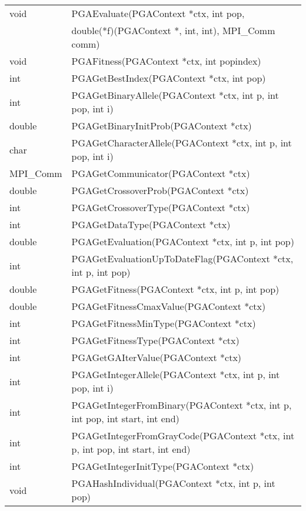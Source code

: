 \documentclass{report}
\begin{document}
\begin{tabular}{|l|l|}
void &  PGAEvaluate(PGAContext *ctx, int pop, \\ 
     & double(*f)(PGAContext *, int, int), MPI\_Comm comm) \\ \hline
void &  PGAFitness(PGAContext *ctx, int popindex) \\ \hline
int &  PGAGetBestIndex(PGAContext *ctx, int pop) \\ \hline
int &  PGAGetBinaryAllele(PGAContext *ctx, int p, int pop, int i) \\ \hline
double &  PGAGetBinaryInitProb(PGAContext *ctx) \\ \hline
char &  PGAGetCharacterAllele(PGAContext *ctx, int p, int pop, int i) \\ \hline
MPI\_Comm & PGAGetCommunicator(PGAContext *ctx) \\ \hline
double &  PGAGetCrossoverProb(PGAContext *ctx) \\ \hline
int &  PGAGetCrossoverType(PGAContext *ctx) \\ \hline
int &  PGAGetDataType(PGAContext *ctx) \\ \hline
double &  PGAGetEvaluation(PGAContext *ctx, int p, int pop) \\ \hline
int &  PGAGetEvaluationUpToDateFlag(PGAContext *ctx, int p, int pop) \\ \hline
double &  PGAGetFitness(PGAContext *ctx, int p, int pop) \\ \hline
double &  PGAGetFitnessCmaxValue(PGAContext *ctx) \\ \hline
int &  PGAGetFitnessMinType(PGAContext *ctx) \\ \hline
int &  PGAGetFitnessType(PGAContext *ctx) \\ \hline
int &  PGAGetGAIterValue(PGAContext *ctx) \\ \hline
int &  PGAGetIntegerAllele(PGAContext *ctx, int p, int pop, int i) \\ \hline
int &  PGAGetIntegerFromBinary(PGAContext *ctx, int p, int pop, int start, int
end) \\ \hline
int &  PGAGetIntegerFromGrayCode(PGAContext *ctx, int p, int pop, int start,
int end) \\ \hline
int &  PGAGetIntegerInitType(PGAContext *ctx) \\ \hline
void & PGAHashIndividual(PGAContext *ctx, int p, int pop) \\ \hline
\end{tabular}
\end{document}
